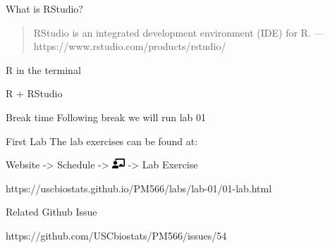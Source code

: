 \documentclass[
  ignorenonframetext,
]{beamer}
\begin{document}
\begin{frame}
\begin{block}{What is RStudio?}
\label{what-is-rstudio}
\begin{quote}
RStudio is an integrated development environment (IDE) for R. ---
https://www.rstudio.com/products/rstudio/
\end{quote}
\end{block}
\end{frame}

\begin{frame}
\end{frame}

\begin{frame}
\begin{block}{R in the terminal}
\label{r-in-the-terminal}
\end{block}
\end{frame}

\begin{frame}
\begin{block}{R + RStudio}
\label{r-rstudio}
\end{block}
\end{frame}

\begin{frame}{Break time}
\label{break-time}
Following break we will run lab 01
\end{frame}

\begin{frame}{First Lab}
\label{first-lab}
The lab exercises can be found at:

Website -\textgreater{} Schedule -\textgreater{}
\includegraphics[width=1.25em,height=1em]{week1_files/figure-beamer/fa-icon-324241782d9e44e9978a25bf05b1d0cd.pdf}
-\textgreater{} Lab Exercise

https://uscbiostats.github.io/PM566/labs/lab-01/01-lab.html

Related Github Issue

https://github.com/USCbiostats/PM566/issues/54
\end{frame}
\end{document}
